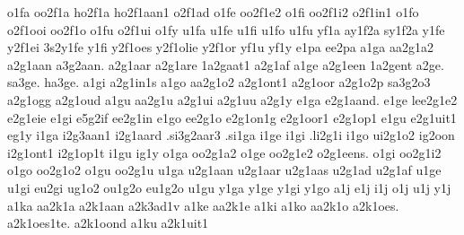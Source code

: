 {o1fa
oo2f1a
ho2f1a
ho2f1aan1
o2f1ad
o1fe
oo2f1e2
o1fi
oo2f1i2
o2f1in1
o1fo
o2f1ooi
oo2f1o
o1fu
o2f1ui
o1fy
%
u1fa
u1fe
u1fi
u1fo
u1fu
%
yf1a
ay1f2a
sy1f2a
y1fe
y2f1ei
3s2y1fe
y1fi
y2f1oes
y2f1olie
y2f1or
yf1u
yf1y
%
%
%
%
e1pa
ee2pa
%
a1ga
aa2g1a2
a2g1aan
a3g2aan.
a2g1aar
a2g1are
1a2gaat1
a2g1af
a1ge
a2g1een
1a2gent
a2ge.
sa3ge.
ha3ge.
a1gi
a2g1in1s
a1go
aa2g1o2
a2g1ont1
a2g1oor
a2g1o2p
sa3g2o3
a2g1ogg
a2g1oud
a1gu
aa2g1u
a2g1ui
a2g1uu
a2g1y
%
e1ga
e2g1aand.
e1ge
lee2g1e2
e2g1eie
e1gi
e5g2if
ee2g1in
e1go
ee2g1o
e2g1on1g
e2g1oor1
e2g1op1
e1gu
e2g1uit1
eg1y
%
i1ga
i2g3aan1
i2g1aard
.si3g2aar3
.si1ga
i1ge
i1gi
.li2g1i
i1go
ui2g1o2
ig2oon
i2g1ont1
i2g1op1t
i1gu
ig1y
%
o1ga
oo2g1a2
o1ge
oo2g1e2
o2g1eens.
o1gi
oo2g1i2
o1go
oo2g1o2
o1gu
oo2g1u
%
u1ga
u2g1aan
u2g1aar
u2g1aas
u2g1ad
u2g1af
u1ge
u1gi
eu2gi
ug1o2
ou1g2o
eu1g2o
u1gu
%
y1ga
y1ge
y1gi
y1go
%
a1j
e1j
i1j
o1j
u1j
y1j
%
a1ka
aa2k1a
a2k1aan
a2k3ad1v
a1ke
aa2k1e
a1ki
a1ko
aa2k1o
a2k1oes.
a2k1oes1te.
a2k1oond
a1ku
a2k1uit1
}
